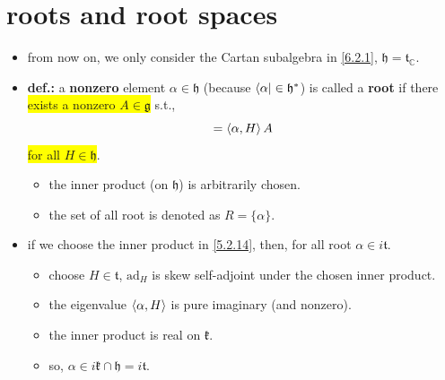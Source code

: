 \section{roots and root spaces}
\begin{itemize}
	\item from now on, we only consider the Cartan subalgebra in \eqref{6.2.1}, $\mathfrak{h} = \mathfrak{t}_\mathbb{C}$.
	
	\item \textbf{def.:} a \textbf{nonzero} element $\alpha \in \mathfrak{h}$ (because $\bra{\alpha} \in \mathfrak{h}^*$) is called a \textbf{root} if there \colorbox{yellow}{exists a nonzero $A \in \mathfrak{g}$} s.t.,
	\begin{equation}
		[H, A] = \braket{\alpha, H} A
	\end{equation}
	\colorbox{yellow}{for all $H \in \mathfrak{h}$}.
	\begin{itemize}
		\item the inner product (on $\mathfrak{h}$) is arbitrarily chosen.
		
		\item the set of all root is denoted as $R = \{\alpha\}$.
	\end{itemize}
	
	\item if we choose the inner product in \eqref{5.2.14}, then, for all root $\alpha \in i \mathfrak{t}$.
	
	\begin{tcolorbox}[title=proof:]
		\begin{itemize}
			\item choose $H \in \mathfrak{t}$, $\mathrm{ad}_H$ is skew self-adjoint under the chosen inner product.
			
			\item the eigenvalue $\braket{\alpha, H}$ is pure imaginary (and nonzero).
			
			\item the inner product is real on $\mathfrak{k}$.
			
			\item so, $\alpha \in i \mathfrak{k} \cap \mathfrak{h} = i \mathfrak{t}$.
		\end{itemize}
	\end{tcolorbox}
	

\end{itemize}
